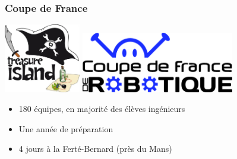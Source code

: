 \documentclass[9pt]{beamer}
\begin{document}
\begin{frame}
	\frametitle{Coupe de France}
	
	\begin{center}
		\includegraphics[width=0.25\textwidth]{treasure-island}
		\hspace{0.5cm}
		\includegraphics[width=0.5\textwidth]{cdf}
	\end{center}
	
	\begin{itemize}
		\item 180 équipes, en majorité des élèves ingénieurs
		\item Une année de préparation
		\item 4 jours à la Ferté-Bernard (près du Mans)
	\end{itemize}

\end{frame}
\end{document}
